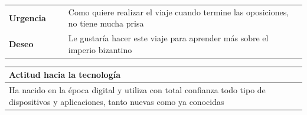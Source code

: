 \documentclass[11pt]{article}
\begin{document}
\begin{table}[H]
  \begin{tabular}{p{0.2\linewidth}|p{0.8\linewidth}}
    \toprule
    \textbf{Urgencia} & Como quiere realizar el viaje cuando termine las oposiciones, no tiene mucha prisa\\
    \textbf{Deseo}  & Le gustaría hacer este viaje para aprender más sobre el imperio bizantino \\
    \bottomrule
  \end{tabular}

  \begin{tabular}{p{1.028\linewidth}}
    \textbf{Actitud hacia la tecnología}\\
    \midrule
    Ha nacido en la época digital y utiliza con total confianza todo tipo de dispositivos y aplicaciones, tanto nuevas como ya conocidas
  \end{tabular}
\end{table}
\end{document}
